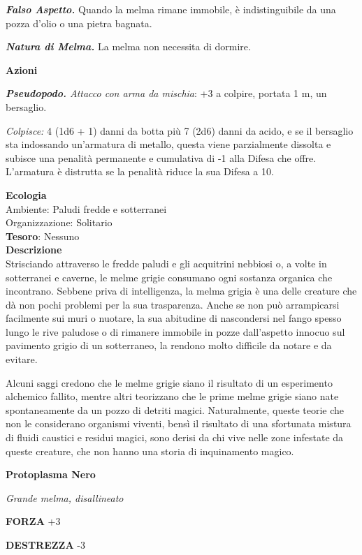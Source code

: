 \begin{multicols}{2}
	\textit{\textbf{Falso Aspetto.}} Quando la melma rimane immobile, è indistinguibile da una pozza d'olio o una pietra bagnata.

	\textit{\textbf{Natura di Melma.}} La melma non necessita di dormire.

	\textbf{Azioni}

	\textit{\textbf{Pseudopodo.} Attacco con arma da mischia}: +3 a colpire, portata 1 m, un bersaglio.

	\textit{Colpisce:} 4 (1d6 + 1) danni da botta più 7 (2d6) danni da acido, e se il bersaglio sta indossando un'armatura di metallo, questa viene parzialmente dissolta e subisce una penalità permanente e cumulativa di -1 alla Difesa che offre. L'armatura è distrutta se la penalità riduce la sua Difesa a 10.

	\textbf{Ecologia}\\
	Ambiente: Paludi fredde e sotterranei\\
	Organizzazione: Solitario\\
	\textbf{Tesoro}: Nessuno\\
	\textbf{Descrizione}\\
	Strisciando attraverso le fredde paludi e gli acquitrini nebbiosi o, a volte in sotterranei e caverne, le melme grigie consumano ogni sostanza organica che incontrano. Sebbene priva di intelligenza, la melma grigia è una delle creature che dà non pochi problemi per la sua trasparenza. Anche se non può arrampicarsi facilmente sui muri o nuotare, la sua abitudine di nascondersi nel fango spesso lungo le rive paludose o di rimanere immobile in pozze dall'aspetto innocuo sul pavimento grigio di un sotterraneo, la rendono molto difficile da notare e da evitare.

	Alcuni saggi credono che le melme grigie siano il risultato di un esperimento alchemico fallito, mentre altri teorizzano che le prime melme grigie siano nate spontaneamente da un pozzo di detriti magici. Naturalmente, queste teorie che non le considerano organismi viventi, bensì il risultato di una sfortunata mistura di fluidi caustici e residui magici, sono derisi da chi vive nelle zone infestate da queste creature, che non hanno una storia di inquinamento magico.


	\medskip{}\textbf{Protoplasma Nero}

	\textit{Grande melma, disallineato}

	\textbf{FORZA} +3

	\textbf{DESTREZZA} -3


\end{multicols}
